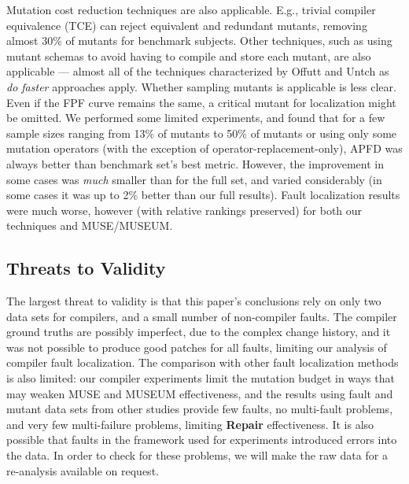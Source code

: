 Mutation cost reduction techniques are also applicable.  E.g., trivial compiler equivalence (TCE) \cite{TCE} can reject equivalent and redundant mutants, removing almost 30\% of mutants for benchmark subjects. Other techniques, such as using mutant schemas to avoid having to compile and store each mutant, are also applicable --- almost all of the techniques characterized by Offutt and Untch \cite{offutt2001mutation} as \emph{do faster} approaches apply.   Whether sampling mutants \cite{RahulISSRE} is applicable is less clear.  Even if the FPF curve remains the same, a critical mutant for localization might be omitted.  We performed some limited experiments, and found that for a few sample sizes ranging from 13\% of mutants to 50\% of mutants or using only some mutation operators (with the exception of operator-replacement-only), APFD was always better than benchmark set's best metric.   However, the improvement in some cases was \emph{much} smaller than for the full set, and varied considerably (in some cases it was up to 2\% better than our full results).  Fault localization results were much worse, however (with relative rankings preserved) for both our techniques and MUSE/MUSEUM.  

\subsection{Threats to Validity}

The largest threat to validity is that this paper's conclusions rely on only two data sets for compilers, and a small number of non-compiler faults.  The compiler ground truths are possibly imperfect, due to the complex change history, and it was not possible to produce good patches for all faults, limiting our analysis of compiler fault localization.    The comparison with other fault localization methods is also limited:  our compiler experiments limit the mutation budget in ways that may weaken MUSE and MUSEUM effectiveness, and the results using fault and mutant data sets from other studies provide few faults, no multi-fault problems, and very few multi-failure problems, limiting {\bf Repair} effectiveness.   It is also possible that faults in the framework used for experiments introduced errors into the data.  In order to check for these problems, we will make the raw data for a re-analysis available on request.  
